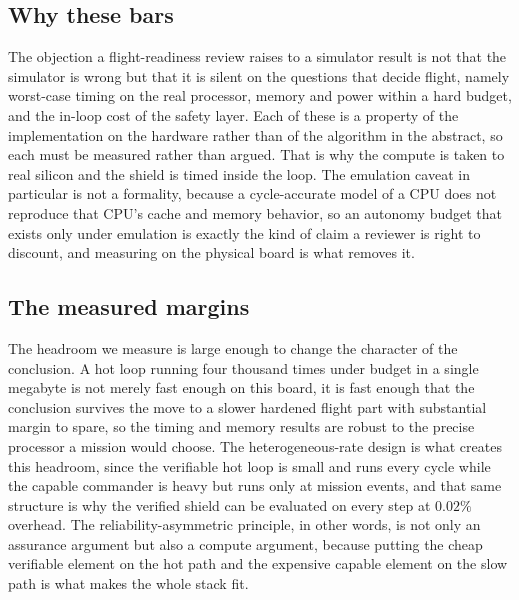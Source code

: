 \documentclass[11pt]{article}
\begin{document}
\subsection{Why these bars} The objection a flight-readiness
review raises to a simulator result is not that the simulator is wrong but that it is silent on
the questions that decide flight, namely worst-case timing on the real processor, memory and power
within a hard budget, and the in-loop cost of the safety layer. Each of these is a property of the
implementation on the hardware rather than of the algorithm in the abstract, so each must be
measured rather than argued. That is why the compute is taken to real silicon and the shield is
timed inside the loop. The emulation caveat in particular is not a formality, because a
cycle-accurate model of a CPU does not reproduce that CPU's cache and memory behavior, so an
autonomy budget that exists only under emulation is exactly the kind of claim a reviewer is right
to discount, and measuring on the physical board is what removes it.

\subsection{The measured margins} The headroom we measure is large enough to change the
character of the conclusion. A hot loop running four thousand times under budget in a single
megabyte is not merely fast enough on this board, it is fast enough that the conclusion survives
the move to a slower hardened flight part with substantial margin to spare, so the timing and
memory results are robust to the precise processor a mission would choose. The heterogeneous-rate
design is what creates this headroom, since the verifiable hot loop is small and runs every cycle
while the capable commander is heavy but runs only at mission events, and that same structure is
why the verified shield can be evaluated on every step at $0.02\%$ overhead. The reliability-asymmetric
principle, in other words, is not only an assurance argument but also a compute argument, because
putting the cheap verifiable element on the hot path and the expensive capable element on the slow
path is what makes the whole stack fit.
\end{document}
